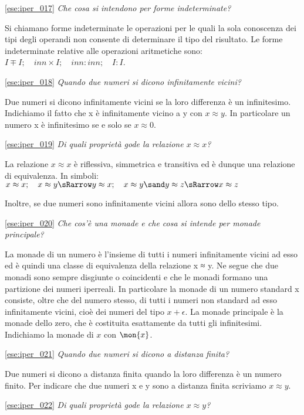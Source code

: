 \ref{ese:iper_017} 
\emph{Che cosa si intendono per forme indeterminate?}

Si chiamano forme indeterminate le operazioni per le quali la sola conoscenza 
dei tipi degli operandi non consente di determinare il tipo del risultato. Le 
forme indeterminate relative alle operazioni aritmetiche sono:
\(I \mp I; \quad inn \times I; \quad inn : inn; \quad I : I\).

\ref{ese:iper_018} 
\emph{Quando due numeri si dicono infinitamente vicini?}

Due numeri si dicono infinitamente vicini se la loro differenza è un 
infinitesimo. Indichiamo il fatto che x è infinitamente vicino a y con 
\(x \approx y\). 
In particolare un numero x è infinitesimo se e solo se \(x \approx 0\).

\ref{ese:iper_019} 
\emph{Di quali proprietà gode la relazione \(x \approx x\)?}

La relazione \(x \approx x\) è riflessiva, simmetrica e transitiva ed è 
dunque 
una relazione di equivalenza. In simboli:\\
\(x \approx x; \quad 
  x \approx y \sRarrow y \approx x; \quad
  x \approx y \sand y \approx z \sRarrow x \approx z\)
  
Inoltre, se due numeri sono infinitamente vicini allora sono dello stesso 
tipo.

\ref{ese:iper_020} 
\emph{Che cos'è una monade e che cosa si intende per monade principale?}

La monade di un numero è l'insieme di tutti i numeri infinitamente vicini ad 
esso ed è quindi una classe di equivalenza della relazione x ≈ y. Ne segue 
che 
due monadi sono sempre disgiunte o coincidenti e che le monadi formano una 
partizione dei numeri iperreali. In particolare la monade di un numero 
standard 
x consiste, oltre che del numero stesso, di tutti i numeri non standard ad 
esso 
infinitamente vicini, cioè dei numeri del tipo \(x + \epsilon\). La monade 
principale è la monade dello zero, che è costituita esattamente da tutti gli 
infinitesimi. Indichiamo la monade di \(x\) con \(\mon{x}\).

\ref{ese:iper_021} 
\emph{Quando due numeri si dicono a distanza finita?}

Due numeri si dicono a distanza finita quando la loro differenza è un numero 
finito. 
Per indicare che due numeri x e y sono a distanza finita scriviamo 
\(x \approx y\).

\ref{ese:iper_022} 
\emph{Di quali proprietà gode la relazione \(x \approx y\)?}

